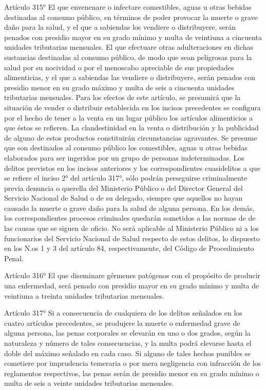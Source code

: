     Artículo 315° El que envenenare o infectare comestibles, aguas u otras bebidas destinadas al consumo público, en términos de poder provocar la muerte o grave daño para la salud, y el que a sabiendas los vendiere o distribuyere, serán penados con presidio mayor en su grado mínimo y multa de veintiuna a cincuenta unidades tributarias mensuales.
    El que efectuare otras adulteraciones en dichas sustancias destinadas al consumo público, de modo que sean peligrosas para la salud por su nocividad o por el menoscabo apreciable de sus propiedades alimenticias, y el que a sabiendas las vendiere o distribuyere, serán penados con presidio menor en su grado máximo y multa de seis a cincuenta unidades tributarias mensuales.
    Para los efectos de este artículo, se presumirá que la situación de vender o distribuir establecida en los incisos precedentes se configura por el hecho de tener a la venta en un lugar público los artículos alimenticios a que éstos se refieren. La clandestinidad en la venta o distribución y la publicidad de alguno de estos productos constituirán circunstancias agravantes.
    Se presume que son destinados al consumo público los comestibles, aguas u otras bebidas elaborados para ser ingeridos por un grupo de personas indeterminadas.
    Los delitos previstos en los incisos anteriores y los correspondientes cuasidelitos a que se refiere el inciso 2° del artículo 317°, sólo podrán perseguirse criminalmente previa denuncia o querella del Ministerio Público o del Director General del Servicio Nacional de Salud o de su delegado, siempre que aquellos no hayan causado la muerte o grave daño para la salud de alguna persona. En los demás, los correspondientes procesos criminales quedarán sometidos a las normas de de las causas que se siguen de oficio.
    No será aplicable al Ministerio Público ni a los funcionarios del Servicio Nacional de Salud respecto de estos delitos, lo dispuesto en los N.os 1 y 3 del artículo 84, respectivamente, del Código de Procedimiento Penal.






    Artículo 316° El que diseminare gérmenes patógenos con el propósito de producir una enfermedad, será penado con presidio mayor en su grado mínimo y multa de veintiuna a treinta unidades tributarias mensuales.


    Artículo 317° Si a consecuencia de cualquiera de los delitos señalados en los cuatro artículos precedentes, se produjere la muerte o enfermedad grave de alguna persona, las penas corporales se elevarán en uno o dos grados, según la naturaleza y número de tales consecuencias, y la multa podrá elevarse hasta el doble del máximo señalado en cada caso.
    Si alguno de tales hechos punibles se cometiere por imprudencia temeraria o por mera negligencia con infracción de los reglamentos respectivos, las penas serán de presidio menor en su grado mínimo o multa de seis a veinte unidades tributarias mensuales.






